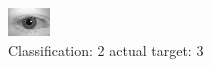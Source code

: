 \begin{figure}[h!]
\begin{center}
\includegraphics[width=0.60\columnwidth]{figures/ID581_class_2_target_3.png}
\end{center}
\caption{ Classification: 2 actual target: 3}
\label{fig:ID581_class_2_target_3}
\end{figure}
